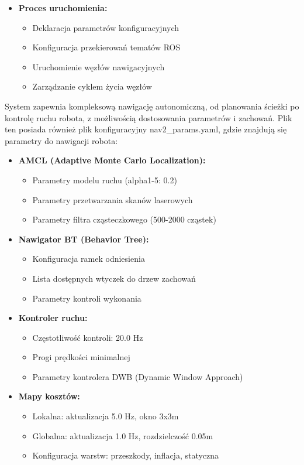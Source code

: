 \documentclass[a4paper,twoside,12pt]{book}
\begin{document}
\begin{itemize}
\begin{itemize}
	\item \textbf{Proces uruchomienia:}
		\begin{itemize}
		\item Deklaracja parametrów konfiguracyjnych
		\item Konfiguracja przekierowań tematów ROS
		\item Uruchomienie węzłów nawigacyjnych
		\item Zarządzanie cyklem życia węzłów
		\end{itemize}
	\end{itemize}

	System zapewnia kompleksową nawigację autonomiczną, od planowania ścieżki po kontrolę ruchu robota, z możliwością dostosowania parametrów i zachowań.
	Plik ten posiada również plik konfiguracyjny nav2\_params.yaml, gdzie znajdują się parametry do nawigacji robota:

	\begin{itemize}
	\item \textbf{AMCL (Adaptive Monte Carlo Localization):}
		\begin{itemize}
		\item Parametry modelu ruchu (alpha1-5: 0.2)
		\item Parametry przetwarzania skanów laserowych
		\item Parametry filtra cząsteczkowego (500-2000 cząstek)
		\end{itemize}

	\item \textbf{Nawigator BT (Behavior Tree):}
		\begin{itemize}
		\item Konfiguracja ramek odniesienia
		\item Lista dostępnych wtyczek do drzew zachowań
		\item Parametry kontroli wykonania
		\end{itemize}

	\item \textbf{Kontroler ruchu:}
		\begin{itemize}
		\item Częstotliwość kontroli: 20.0 Hz
		\item Progi prędkości minimalnej
		\item Parametry kontrolera DWB (Dynamic Window Approach)
		\end{itemize}

	\item \textbf{Mapy kosztów:}
		\begin{itemize}
		\item Lokalna: aktualizacja 5.0 Hz, okno 3x3m
		\item Globalna: aktualizacja 1.0 Hz, rozdzielczość 0.05m
		\item Konfiguracja warstw: przeszkody, inflacja, statyczna
		\end{itemize}


\end{itemize}
\end{itemize}
\end{document}
